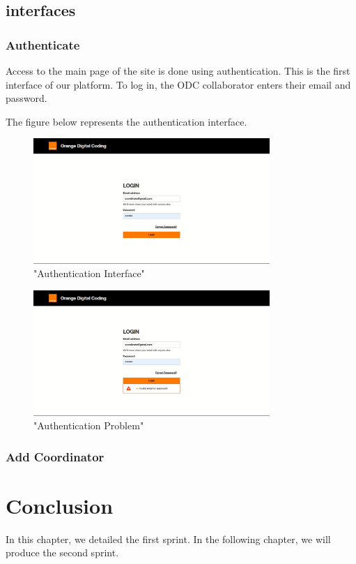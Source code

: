 \subsection{interfaces}
\newpage
\subsubsection{Authenticate}

Access to the main page of the site is done using authentication. This is the first interface of our platform. To log in, the ODC collaborator enters their email and password.

The figure below represents the authentication interface.

\begin{figure}[h!]
    \centering
    \includegraphics[width=0.8\textwidth]{images/login.JPG}
    \caption{"Authentication Interface"}
    \label{fig:"Authentication Interface"}
\end{figure}


\begin{figure}[h!]
    \centering
    \includegraphics[width=0.8\textwidth]{images/loginerr.JPG}
    \caption{"Authentication Problem"}
    \label{fig:"Authentication Problem"}
\end{figure}
\subsubsection{Add Coordinator}
 \section{Conclusion}
 In this chapter, we detailed the first sprint. In the following chapter, we will produce the second sprint.
 